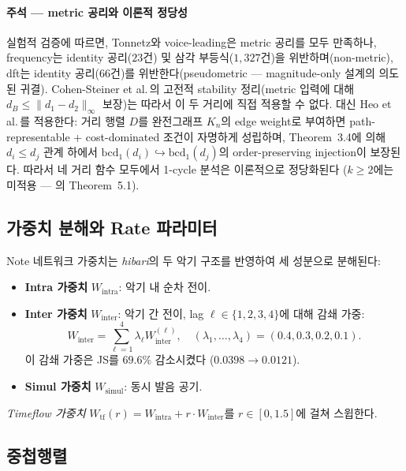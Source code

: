 \documentclass[11pt,a4paper]{article}
\begin{document}
\paragraph{주석 --- metric 공리와 이론적 정당성}
\label{para:metric_axioms}
실험적 검증에 따르면, Tonnetz와 voice-leading은 metric 공리를 모두 만족하나,
frequency는 identity 공리($23$건) 및 삼각 부등식($1{,}327$건)을 위반하며(non-metric),
dft는 identity 공리($66$건)를 위반한다(pseudometric --- magnitude-only 설계의 의도된 귀결).
Cohen-Steiner et al.\,\cite{cohensteiner2007}의 고전적 stability 정리(metric 입력에 대해
$d_B \le \|d_1-d_2\|_\infty$ 보장)는 따라서 이 두 거리에 직접 적용할 수 없다.
대신 Heo et al.\,\cite{heo2025}를 적용한다:
거리 행렬 $D$를 완전그래프 $K_n$의 edge weight로 부여하면 path-representable +
cost-dominated 조건이 자명하게 성립하며, Theorem~3.4에 의해
$d_i \le d_j$ 관계 하에서 $\mathrm{bcd}_1(d_i)\hookrightarrow\mathrm{bcd}_1(d_j)$의
order-preserving injection이 보장된다.
따라서 네 거리 함수 모두에서 1-cycle 분석은 이론적으로 정당화된다
($k \ge 2$에는 미적용 --- \cite{heo2025}의 Theorem~5.1).

\subsection{가중치 분해와 Rate 파라미터}
\label{subsec:weights}

Note 네트워크 가중치는 \emph{hibari}의 두 악기 구조를 반영하여
세 성분으로 분해된다:

\begin{itemize}
\item \textbf{Intra 가중치} $W_{\mathrm{intra}}$: 악기 내 순차 전이.
\item \textbf{Inter 가중치} $W_{\mathrm{inter}}$: 악기 간 전이,
      lag $\ell \in \{1,2,3,4\}$에 대해 감쇄 가중:
\begin{equation}
W_{\mathrm{inter}} = \sum_{\ell=1}^{4} \lambda_\ell W_{\mathrm{inter}}^{(\ell)},
\quad (\lambda_1,\ldots,\lambda_4) = (0.4, 0.3, 0.2, 0.1).
\end{equation}
      이 감쇄 가중은 JS를 $69.6\%$ 감소시켰다 ($0.0398 \to 0.0121$).
\item \textbf{Simul 가중치} $W_{\mathrm{simul}}$: 동시 발음 공기.
\end{itemize}

\emph{Timeflow 가중치} $W_{\mathrm{tf}}(r) = W_{\mathrm{intra}} + r \cdot W_{\mathrm{inter}}$를
$r \in [0, 1.5]$에 걸쳐 스윕한다.

\subsection{중첩행렬}
\label{subsec:overlap}
\end{document}
